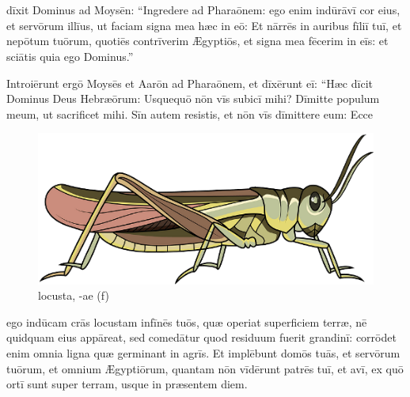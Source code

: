 \chapter{}


\thispagestyle{empty}

 dīxit Dominus ad Moysēn: ``Ingredere ad Pharaōnem: ego enim indūrāvī cor eius, et servōrum illīus, ut faciam signa mea hæc in eō:
Et nārrēs in auribus fīliī tuī, et nepōtum tuōrum,
quotiēs contrīverim Ægyptiōs, et signa mea fēcerim in eīs:
et sciātis quia ego Dominus.''

Introiērunt ergō
Moysēs et Aarōn ad Pharaōnem, et dīxērunt eī: ``Hæc dīcit
Dominus Deus Hebræōrum: Usquequō nōn vīs
subicī mihi? Dīmitte populum meum, ut
sacrificet mihi.  Sīn autem resistis, et nōn vīs dīmittere eum: Ecce
\begin{figure}[ht]
    \centering
    \includegraphics{locusta}
    \caption{locusta, -ae (f)}
\end{figure}%
ego indūcam crās locustam in\linebreak fīnēs tuōs, quæ operiat
superficiem terræ, nē quidquam eius appāreat, sed
comedātur quod residuum
fuerit grandinī: corrōdet enim omnia ligna quæ
germinant in agrīs.  Et implēbunt domōs tuās, et servōrum
tuōrum, et omnium Ægyptiōrum, quantam nōn vīdērunt patrēs tuī, et avī, ex
quō ortī sunt super terram, usque in præsentem diem. 

